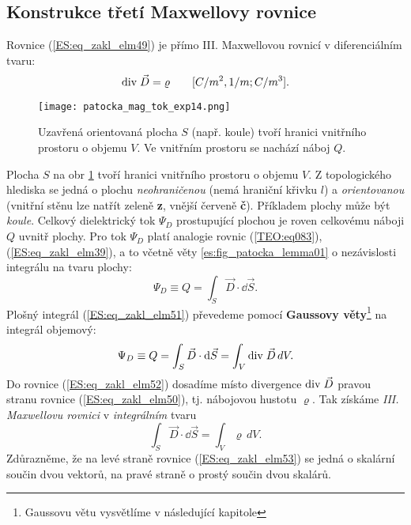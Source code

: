     \subsection{Konstrukce třetí Maxwellovy rovnice}\label{ES:ssec02}
      Rovnice (\ref{ES:eq_zakl_elm49}) je přímo III. Maxwellovou rovnicí v diferenciálním tvaru:
      \begin{equation}\label{ES:eq_zakl_elm50}
        \mathrm{div}\;\vec{D} = \varrho \qquad [C/m^2, 1/m; C/m^3]. 
      \end{equation} 
      \begin{figure}[ht!]
        \centering
        \texttt{[image: patocka\_mag\_tok\_exp14.png]}
        \caption{Uzavřená orientovaná plocha \(S\) (např. koule) tvoří hranici vnitřního prostoru o 
                 objemu \(V\). Ve vnitřním prostoru se nachází náboj \(Q\).}
        \label{es:fig_patocka_mag_tok_exp14}
      \end{figure}
      
      Plocha \(S\) na obr \ref{es:fig_patocka_mag_tok_exp14} tvoří hranici vnitřního prostoru o 
      objemu \(V\). Z topologického hlediska se jedná o plochu \emph{neohraničenou} (nemá hraniční 
      křivku \(l\)) a \emph{orientovanou} (vnitřní stěnu lze natřít zeleně \textbf{z}, vnější 
      červeně \textbf{č}). Příkladem plochy může být \emph{koule}. Celkový dielektrický tok 
      \(\Psi_D\) prostupující plochou je roven celkovému náboji \(Q\) uvnitř plochy. Pro tok 
      \(\Psi_D\) platí analogie rovnic (\ref{TEO:eq083}), (\ref{ES:eq_zakl_elm39}), a to 
      včetně věty \ref{es:fig_patocka_lemma01} o nezávislosti integrálu na tvaru plochy:
      \begin{equation}\label{ES:eq_zakl_elm51}
        \Psi_D \equiv Q = \int_S\vec{D}\cdot \dd{\vec{S}}.
      \end{equation} 
      Plošný integrál (\ref{ES:eq_zakl_elm51}) převedeme pomocí \textbf{Gaussovy 
      věty}\footnote{Gaussovu větu vysvětlíme v následující kapitole} na integrál objemový:
      \begin{equation}\label{ES:eq_zakl_elm52}
        \Psi_D \equiv Q = \int_S\vec{D}\cdot \mathop{}\!\mathrm{d}\vec{S} = \int_V\mathrm{div}\;\vec{D}\,dV.
      \end{equation} 
      Do rovnice (\ref{ES:eq_zakl_elm52}) dosadíme místo divergence \(\mathrm{div}\;\vec{D}\) pravou stranu 
      rovnice (\ref{ES:eq_zakl_elm50}), tj. nábojovou hustotu \(\varrho\). Tak získáme \emph{III. 
      Maxwellovu rovnici} v \emph{integrálním} tvaru
      \begin{equation}\label{ES:eq_zakl_elm53}
        \boxed{\int_S\vec{D}\cdot \dd{\vec{S}} = \int_V\varrho\,dV}.
      \end{equation} 
      Zdůrazněme, že na levé straně rovnice (\ref{ES:eq_zakl_elm53}) se jedná o skalární součin 
      dvou vektorů, na pravé straně o prostý součin dvou skalárů.
      
